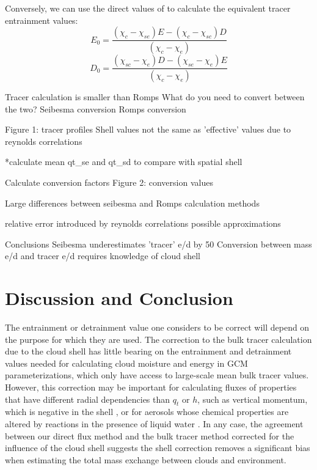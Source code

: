 \documentclass[draft,grl]{AGUTeX}
\begin{document}
\begin{article}
Conversely, we can use the direct values of \cite{Romps2010} to calculate the 
equivalent tracer entrainment values:
\begin{equation}
  \label{eq:inverted_entrainment}
    E_0 = \frac{(\chi_{c} - \chi_{se})E - (\chi_{c} - \chi_{sc})D}
             {(\chi_{c} - \chi_{e})}
\end{equation}
\begin{equation}
  \label{eq:inverted_detrainment}
    D_0 = \frac{(\chi_{sc} - \chi_{e})D - (\chi_{se} - \chi_{e})E}
             {(\chi_{c} - \chi_{e})}
\end{equation}


Tracer calculation is smaller than Romps
What do you need to convert between the two?
Seibesma conversion
Romps conversion

Figure 1: tracer profiles
Shell values not the same as 'effective' values due to reynolds correlations

*calculate mean qt_se and qt_sd to compare with spatial shell

Calculate conversion factors
Figure 2: conversion values

Large differences between seibesma and Romps calculation methods

relative error introduced by reynolds correlations
possible approximations

Conclusions
Seibesma underestimates 'tracer' e/d by 50%
Conversion between mass e/d and tracer e/d requires knowledge of cloud shell





\section{Discussion and Conclusion}

The entrainment or detrainment value one considers to be correct will depend on 
the purpose for which they are used.  The correction to the bulk tracer 
calculation due to the cloud shell has little bearing on the entrainment and 
detrainment values needed for calculating cloud moisture and energy in GCM 
parameterizations, which only have access to large-scale mean bulk tracer 
values.  However, this correction may be important for calculating 
fluxes of properties that have different radial dependencies than $q_t$ or $h$, 
such as vertical momentum, which is negative in the shell \citep{Heus2008}, or 
for aerosols whose chemical properties are altered by reactions in the presence 
of liquid water \citep{Hoppel1994}.  In any case, the agreement between our 
direct flux method and the bulk tracer method corrected for the influence of 
the cloud shell suggests the shell correction removes a significant bias when 
estimating the total mass exchange between clouds and environment.


\end{article}
\end{document}
